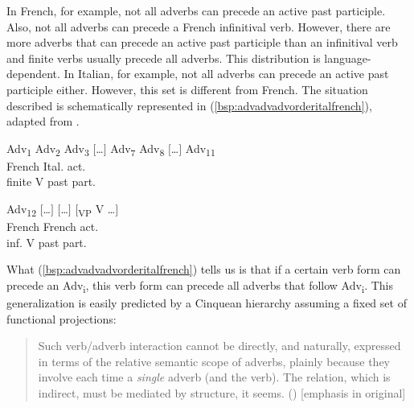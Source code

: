 \largerpage
In French, for example, not all adverbs can precede an active past participle. Also, not all adverbs can precede a French infinitival verb. However, there are more adverbs that can precede an active past participle than an infinitival verb and finite verbs usually precede all adverbs. This distribution is language-dependent. In Italian, for example, not all adverbs can precede an active past participle either. However, this set is different from French. The situation described is schematically represented in (\ref{bsp:advadvadvorderitalfrench}), adapted from \citet[686]{cinque2004issues}.

\begin{exe}
\ex\label{bsp:advadvadvorderitalfrench} 
\glll {\hspace*{3ex}\textbullet} {Adv\textsubscript{1}} {Adv\textsubscript{2}} {Adv\textsubscript{3}} {$[$\dots$]$} {Adv\textsubscript{7}} {\hspace*{4ex}\textbullet } {Adv\textsubscript{8}} {$[$\dots$]$} {Adv\textsubscript{11}}\\
{\hspace*{0.5ex}French} {} {} {} {} {} {\hspace*{0.5ex}Ital. act.} {} {} {} \\ 
{\hspace*{0.2ex}finite V} {} {} {} {} {} {past part.} {} {} {} \\ \medskip\par
\glll {\hspace*{3ex}\textbullet } {Adv\textsubscript{12}} {$[$\dots$]$} {\hspace*{5ex}\textbullet } {$[$\dots$]$} {$[$\textsubscript{VP} V \dots$]$} \\
{\hspace*{0.5ex}French} {} {} {\hspace*{0.5ex}French act.} {} {}\\
{\hspace*{1ex}inf. V} {} {} {\hspace*{1.8ex}past part.} {} {}\\
\end{exe}

\noindent What (\ref{bsp:advadvadvorderitalfrench}) tells us is that if a certain verb form can precede an Adv\textsubscript{i}, this verb form can precede all adverbs that follow Adv\textsubscript{i}. This generalization is easily predicted by a Cinquean hierarchy assuming a fixed set of functional projections:

\begin{quote}
Such verb/adverb interaction cannot be directly, and naturally, expressed in terms of the relative semantic scope of adverbs, plainly because they involve each time a \textit{single} adverb (and the verb). The relation, which is indirect, must be mediated by structure, it seems. (\citealt[686]{cinque2004issues}) [emphasis in original]
\end{quote}

